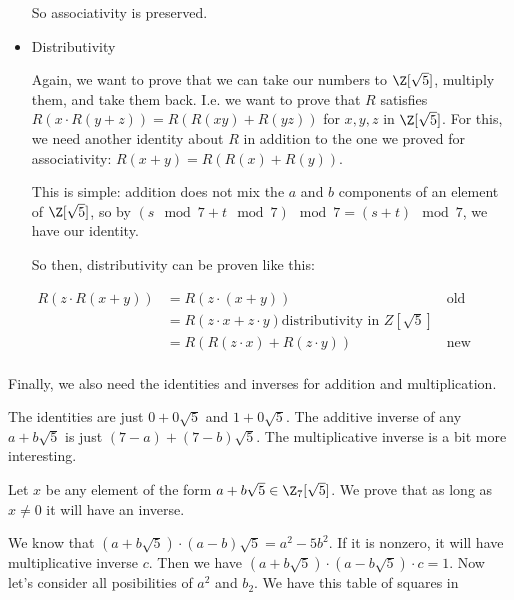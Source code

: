 \begin{itemize}
    So associativity is preserved.

    \item Distributivity
    
    Again, we want to prove that we can take our numbers to $\Z[\sqrt5]$, multiply them, and take them back. I.e. we want to prove that $R$ satisfies $R(x\cdot R(y+z)) = R(R(xy) + R(yz))$ for $x, y, z$ in $\Z[\sqrt5]$. For this, we need another identity about $R$ in addition to the one we proved for associativity: $R(x+y) = R(R(x) + R(y))$.

    This is simple: addition does not mix the $a$ and $b$ components of an element of $\Z[\sqrt5]$, so by $(s \mod 7 + t \mod 7)\mod 7 = (s+t) \mod 7$, we have our identity.

    So then, distributivity can be proven like this:

    \begin{align*}
      R(z\cdot R(x+y)) &= R(z\cdot(x+y)) && \text{old identity}\\
      &= R(z\cdot x + z\cdot y) \text{distributivity in $Z[\sqrt5]$}\\
      &= R(R(z\cdot x) + R(z\cdot y)) && \text{new identity}\\
    \end{align*}
    

    
    
  \end{itemize}

  Finally, we also need the identities and inverses for addition and multiplication.

  The identities are just $0+0\sqrt5$ and $1+0\sqrt5$. The additive inverse of any $a+b\sqrt5$ is just $(7-a) + (7-b)\sqrt5$. The multiplicative inverse is a bit more interesting.

  Let $x$ be any element of the form $a+b\sqrt5 \in \Z_7[\sqrt5]$. We prove that as long as $x\neq 0$ it will have an inverse.

  We know that $(a+b\sqrt5)\cdot (a-b)\sqrt5 = a^2 - 5b^2$. If it is nonzero, it will have multiplicative inverse $c$. Then we have $(a+b\sqrt5) \cdot (a-b\sqrt5)\cdot c = 1$. Now let's consider all posibilities of $a^2$ and $b_2$. We have this table of squares in 
  